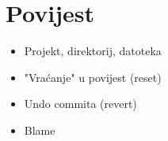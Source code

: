 \chapter*{Povijest}

\begin{itemize}
	\item Projekt, direktorij, datoteka
	\item "Vraćanje" u povijest (reset)
	\item Undo commita (revert)
	\item Blame
\end{itemize}


